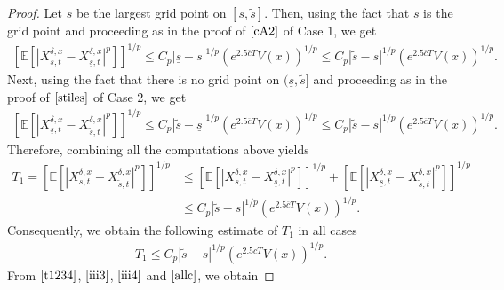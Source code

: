 \documentclass[11pt]{article}
\theoremstyle{theorem}
\theoremstyle{definition}
\newcommand{\1}{{\bf 1}}
\begin{document}
\begin{proof}
Let $\underline{s}$ be the largest grid point on $[s,\widetilde{s}].$ Then, using the fact that $\underline{s}$  is the grid point and proceeding as in the proof of $\eqref{cA2}$ of Case $1$, we get
 \begin{align*} \left[\mathbb{E}\left[\left|X^{\delta, x}_{s,t}-X^{\delta, x}_{\underline{s},t}\right|^p\right]\right]^{1/p} \leq C_p |\underline{s} -s|^{1/p} (e^{2.5\overline{c}T}V(x))^{1/p} \leq C_p |\widetilde{s} -s|^{1/p} (e^{2.5\overline{c}T}V(x))^{1/p}.
\end{align*}
Next, using the fact that there is no grid point on  $(\underline{s}, \widetilde{s}]$ and proceeding as in the proof of $\eqref{stiles}$ of Case 2, we get
\begin{align*}
\left[\mathbb{E}\left[\left|X^{\delta, x}_{\underline{s},t}-X^{\delta, x}_{\widetilde{s},t}\right|^p\right]\right]^{1/p}\leq  C_p |\widetilde{s} -\underline{s}|^{1/p} (e^{2.5\overline{c}T}V(x))^{1/p}\leq  C_p |\widetilde{s} -s|^{1/p} (e^{2.5\overline{c}T}V(x))^{1/p}.
\end{align*}
Therefore, combining all the computations above yields 
\begin{align*}
T_1 = \left[\mathbb{E}\left[\left|X^{\delta, x}_{s,t}-X^{\delta, x}_{\widetilde{s},t}\right|^p\right]\right]^{1/p} & \leq  \left[\mathbb{E}\left[\left|X^{\delta, x}_{s,t}-X^{\delta, x}_{\underline{s},t}\right|^p\right]\right]^{1/p} + \left[\mathbb{E}\left[\left|X^{\delta, x}_{\underline{s},t}-X^{\delta, x}_{\widetilde{s},t}\right|^p\right]\right]^{1/p}\\
&\leq C_p |\widetilde{s} -s|^{1/p} (e^{2.5\overline{c}T}V(x))^{1/p}.
\end{align*}
Consequently, we obtain the following estimate of $T_1$ in all cases
 \begin{align} T_1 \leq C_p |\widetilde{s} -s|^{1/p} (e^{2.5\overline{c}T}V(x))^{1/p}.
 \label{allc}
 \end{align} 
From $\eqref{t1234}$,  $\eqref{iii3}$, $\eqref{iii4}$ and $\eqref{allc}$, we obtain

\end{proof}
\end{document}
